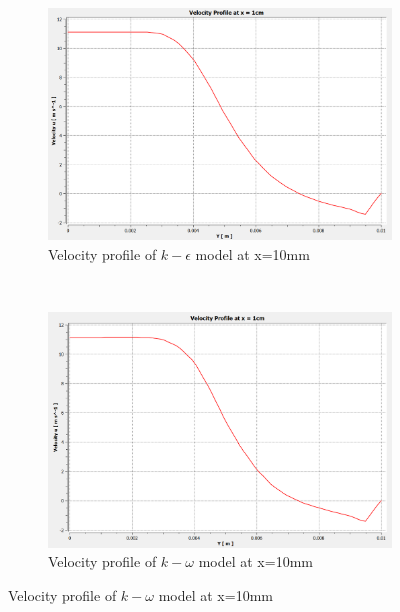 \begin{figure}[H]
    ~
    \begin{subfigure}{.48\textwidth}
    \centering
    \includegraphics[width=.95\linewidth]{images/task2/task2-1/cs3.png}
    \caption{Velocity profile of $k-\epsilon$ model at x=10mm}
\end{subfigure}
    ~
    \begin{subfigure}{.48\textwidth}
    \centering
    \includegraphics[width=.95\linewidth]{images/task2/task2-2/cs3.png}
    \caption{Velocity profile of $k-\omega$ model at x=10mm}
\end{subfigure}



\end{figure}
